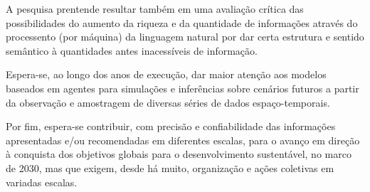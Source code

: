 \documentclass[
	11pt,				%
	openany,			%
	oneside,			%
	a4paper,			%
	english,			%
	french,				%
	spanish,			%
	brazil,				%
	]{abntex2}
\begin{document}
A pesquisa prentende resultar também em uma avaliação crítica das possibilidades do aumento da riqueza e da quantidade de informações através do processento (por máquina) da linguagem natural por dar certa estrutura e sentido semântico à quantidades antes inacessíveis de informação.

Espera-se, ao longo dos anos de execução, dar maior atenção aos modelos baseados em agentes para simulações e inferências sobre cenários futuros a partir da observação e amostragem de diversas séries de dados espaço-temporais.

Por fim, espera-se contribuir, com precisão e confiabilidade das informações apresentadas e/ou recomendadas em diferentes escalas, para o avanço em direção à conquista dos objetivos globais para o desenvolvimento sustentável, no marco de 2030, mas que exigem, desde há muito, organização e ações coletivas em variadas escalas.

%
%
%


%

\end{document}
